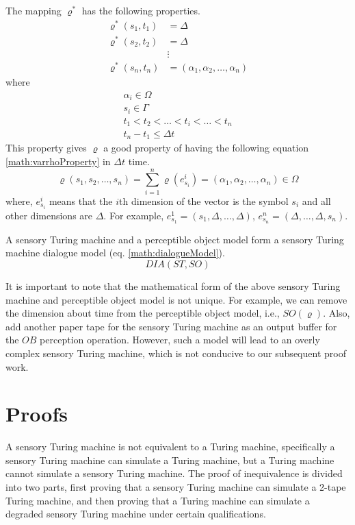The mapping $\varrho^*$ has the following properties.
\begin{align}
    \varrho^*(s_1, t_1) & = \Delta \\
    \varrho^*(s_2, t_2) & = \Delta \\
              \nonumber & \vdots \\ 
    \varrho^*(s_n, t_n) & = (\alpha_1, \alpha_2, \dots, \alpha_n)
\end{align}
where
\begin{gather}
    \alpha_i \in \Omega \\
    s_i \in \Gamma \\
    t_1 < t_2 < \dots < t_i < \dots < t_n \\
    t_n - t_1 \leq \Delta t
\end{gather}
This property gives $\varrho$ a good property of having the following equation \ref{math:varrhoProperty} in $\Delta t$ time.
\begin{equation}\label{math:varrhoProperty}
    \varrho(s_1, s_2, \dots, s_n) = \sum_{i=1}^n\varrho(e_{s_i}^i) = (\alpha_1, \alpha_2, \dots, \alpha_n) \in \Omega
\end{equation}
where, $e_{s_i}^i$ means that the $i$th dimension of the vector is the symbol $s_i$ and all other dimensions are $\Delta$. For example, $e_{s_1}^1=(s_1,\Delta, \dots, \Delta)$, $e_{s_n}^n=(\Delta,\dots, \Delta,s_n)$.

A sensory Turing machine and a perceptible object model form a sensory Turing machine dialogue model (eq. \ref{math:dialogueModel}).
\begin{equation}\label{math:dialogueModel}
    DIA(ST, SO)
\end{equation}

It is important to note that the mathematical form of the above sensory Turing machine and perceptible object model is not unique. For example, we can remove the dimension about time from the perceptible object model, i.e., $SO(\varrho)$. Also, add another paper tape for the sensory Turing machine as an output buffer for the $OB$ perception operation. However, such a model will lead to an overly complex sensory Turing machine, which is not conducive to our subsequent proof work.

\section{Proofs}
A sensory Turing machine is not equivalent to a Turing machine, specifically a sensory Turing machine can simulate a Turing machine, but a Turing machine cannot simulate a sensory Turing machine. The proof of inequivalence is divided into two parts, first proving that a sensory Turing machine can simulate a 2-tape Turing machine, and then proving that a Turing machine can simulate a degraded sensory Turing machine under certain qualifications.

